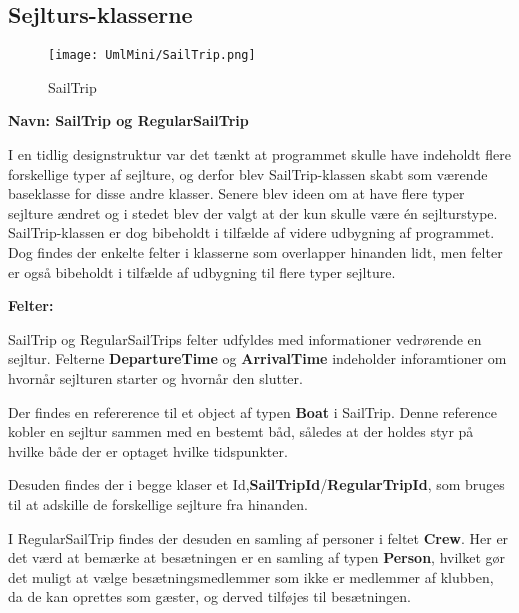  
\subsection*{Sejlturs-klasserne}
\begin{wrapfigure}[12]{R}{0.4\textwidth}
    \label{img:SailTrip}
    \vspace{-20pt}
    \begin{center}
        \texttt{[image: UmlMini/SailTrip.png]}
    \end{center}
    \vspace{-20pt}
    \caption{SailTrip}
\end{wrapfigure}
\textbf{Navn: SailTrip og RegularSailTrip}

I en tidlig designstruktur var det tænkt at programmet skulle have indeholdt flere forskellige typer af sejlture, og derfor blev SailTrip-klassen skabt som værende baseklasse for disse andre klasser. 
Senere blev ideen om at have flere typer sejlture ændret og i stedet blev der valgt at der kun skulle være én sejlturstype. 
SailTrip-klassen er dog bibeholdt i tilfælde af videre udbygning af programmet.
Dog findes der enkelte felter i klasserne som overlapper hinanden lidt, men felter er også bibeholdt i tilfælde af udbygning til flere typer sejlture.

\textbf{Felter:}

SailTrip og RegularSailTrips felter udfyldes med informationer vedrørende en sejltur.
Felterne \textbf{DepartureTime} og \textbf{ArrivalTime} indeholder inforamtioner om hvornår sejlturen starter og hvornår den slutter.

Der findes en refererence til et object af typen \textbf{Boat} i SailTrip.
Denne reference kobler en sejltur sammen med en bestemt båd, således at der holdes styr på hvilke både der er optaget hvilke tidspunkter.

Desuden findes der i begge klaser et Id,\textbf{SailTripId}/\textbf{RegularTripId}, som bruges til at adskille de forskellige sejlture fra hinanden.

I RegularSailTrip findes der desuden en samling af personer i feltet \textbf{Crew}.
Her er det værd at bemærke at besætningen er en samling af typen \textbf{Person}, hvilket gør det muligt at vælge besætningsmedlemmer som ikke er medlemmer af klubben, da de kan oprettes som gæster, og derved tilføjes til besætningen.

